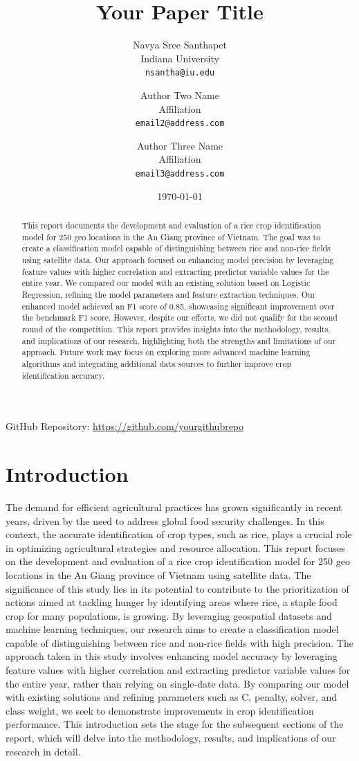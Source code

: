 \documentclass[12pt]{article}
\title{Your Paper Title}
\author{
    Navya Sree Santhapet \\ Indiana University \\ \texttt{nsantha@iu.edu} \and
    Author Two Name \\ Affiliation \\ \texttt{email2@address.com} \and
    Author Three Name \\ Affiliation \\ \texttt{email3@address.com}
}
\date{\today}
\begin{document}
\maketitle

\begin{center}
    GitHub Repository: \url{https://github.com/yourgithubrepo}
\end{center}

\begin{abstract}
This report documents the development and evaluation of a rice crop identification model for 250 geo locations in the An Giang province of Vietnam. The goal was to create a classification model capable of distinguishing between rice and non-rice fields using satellite data. Our approach focused on enhancing model precision by leveraging feature values with higher correlation and extracting predictor variable values for the entire year. We compared our model with an existing solution based on Logistic Regression, refining the model parameters and feature extraction techniques. Our enhanced model achieved an F1 score of 0.85, showcasing significant improvement over the benchmark F1 score. However, despite our efforts, we did not qualify for the second round of the competition. This report provides insights into the methodology, results, and implications of our research, highlighting both the strengths and limitations of our approach. Future work may focus on exploring more advanced machine learning algorithms and integrating additional data sources to further improve crop identification accuracy.
\end{abstract}

\section{Introduction}
The demand for efficient agricultural practices has grown significantly in recent years, driven by the need to address global food security challenges. In this context, the accurate identification of crop types, such as rice, plays a crucial role in optimizing agricultural strategies and resource allocation. This report focuses on the development and evaluation of a rice crop identification model for 250 geo locations in the An Giang province of Vietnam using satellite data. The significance of this study lies in its potential to contribute to the prioritization of actions aimed at tackling hunger by identifying areas where rice, a staple food crop for many populations, is growing. By leveraging geospatial datasets and machine learning techniques, our research aims to create a classification model capable of distinguishing between rice and non-rice fields with high precision. The approach taken in this study involves enhancing model accuracy by leveraging feature values with higher correlation and extracting predictor variable values for the entire year, rather than relying on single-date data. By comparing our model with existing solutions and refining parameters such as C, penalty, solver, and class weight, we seek to demonstrate improvements in crop identification performance. This introduction sets the stage for the subsequent sections of the report, which will delve into the methodology, results, and implications of our research in detail.
\end{document}
